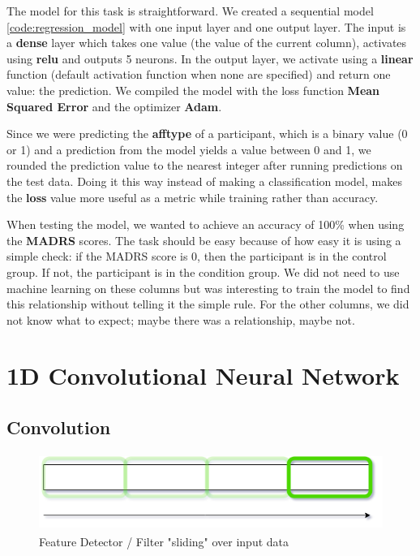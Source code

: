 

The model for this task is straightforward. We created a sequential model \ref{code:regression_model} with one input layer and one output layer. The input is a \textbf{dense} layer which takes one value (the value of the current column), activates using \textbf{relu} and outputs 5 neurons. In the output layer, we activate using a \textbf{linear} function (default activation function when none are specified) and return one value: the prediction. We compiled the model with the loss function \textbf{Mean Squared Error} and the optimizer \textbf{Adam}. 

Since we were predicting the \textbf{afftype} of a participant, which is a binary value (0 or 1) and a prediction from the model yields a value between 0 and 1, we rounded the prediction value to the nearest integer after running predictions on the test data. Doing it this way instead of making a classification model, makes the \textbf{loss} value more useful as a metric while training rather than accuracy. 

When testing the model, we wanted to achieve an accuracy of 100\% when using the \textbf{MADRS} scores. The task should be easy because of how easy it is using a simple check: if the MADRS score is 0, then the participant is in the control group. If not, the participant is in the condition group. We did not need to use machine learning on these columns but was interesting to train the model to find this relationship without telling it the simple rule. For the other columns, we did not know what to expect; maybe there was a relationship, maybe not.

\section{1D Convolutional Neural Network}

\subsection{Convolution}

\begin{figure}[h]
\begin{center}
    \includegraphics[height=2.5cm]{img/feature_detector.png}
    \caption{Feature Detector / Filter "sliding" over input data}
    \label{figure:feature_detector}
\end{center}
\end{figure}

